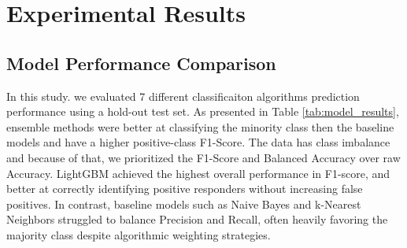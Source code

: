 \documentclass[conference]{IEEEtran}
\begin{document}
\section{Experimental Results}
\label{sec:results}


\subsection{Model Performance Comparison}
In this study. we evaluated 7 different classificaiton algorithms prediction performance using a hold-out test set. 
As presented in Table \ref{tab:model_results}, ensemble methods were better at classifying the minority class then the baseline models and have a higher positive-class F1-Score. 
The data has class imbalance and because of that, we prioritized the F1-Score and Balanced Accuracy over raw Accuracy. 
LightGBM achieved the highest overall performance in F1-score, and better at correctly identifying positive responders without increasing false positives. 
In contrast, baseline models such as Naive Bayes and k-Nearest Neighbors struggled to balance Precision and Recall, often heavily favoring the majority class despite algorithmic weighting strategies.

\begin{table}[htbp]
\caption{Classification Model Performance Comparison}
\label{tab:model_results}
\centering
{}
\end{table}
\end{document}
